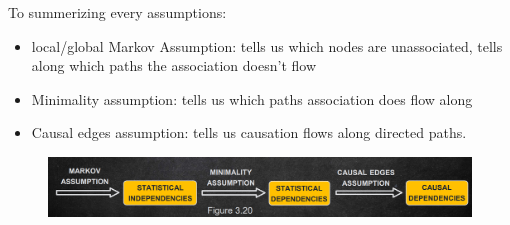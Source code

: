 To summerizing every assumptions:
\begin{itemize}
    \item local/global Markov Assumption: tells us which nodes are unassociated, tells 
    along which paths the association doesn't flow
    \item Minimality assumption: tells us which paths association does flow along
    \item Causal edges assumption: tells us causation flows along directed paths.
\end{itemize}
\begin{figure}[!h]
    \centering
    \includegraphics*[width=\textwidth]{img/causal_networks_assumptions.png}
\end{figure}

